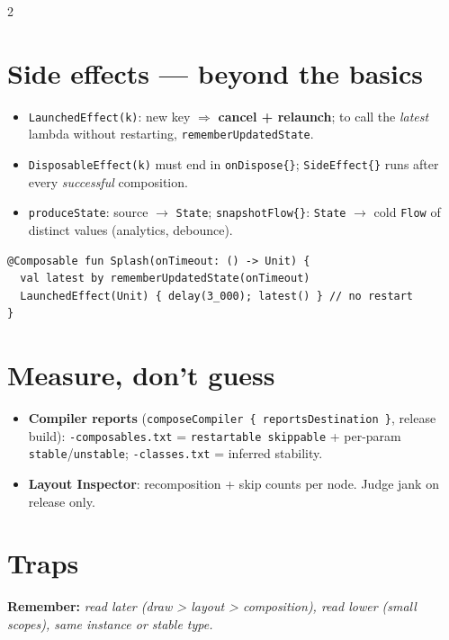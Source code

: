 \documentclass[8pt]{extarticle}
\begin{document}
\begin{multicols}{2}
\section{Side effects — beyond the basics}
\begin{itemize}\raggedright
  \item \texttt{LaunchedEffect(k)}: new key $\Rightarrow$ \textbf{cancel + relaunch}; to call
        the \emph{latest} lambda without restarting, \texttt{rememberUpdatedState}.
  \item \texttt{DisposableEffect(k)} must end in \texttt{onDispose\{\}};
        \texttt{SideEffect\{\}} runs after every \emph{successful} composition.
  \item \texttt{produceState}: source $\to$ \texttt{State}; \texttt{snapshotFlow\{\}}:
        \texttt{State} $\to$ cold \texttt{Flow} of distinct values (analytics, debounce).
\end{itemize}
\begin{lstlisting}[language=KotlinSheet]
@Composable fun Splash(onTimeout: () -> Unit) {
  val latest by rememberUpdatedState(onTimeout)
  LaunchedEffect(Unit) { delay(3_000); latest() } // no restart
}
\end{lstlisting}

\section{Measure, don't guess}
\begin{itemize}\raggedright
  \item \textbf{Compiler reports} (\texttt{composeCompiler \{ reportsDestination \}}, release
        build): \texttt{-composables.txt} = \texttt{restartable skippable} + per-param
        \texttt{stable}/\texttt{unstable}; \texttt{-classes.txt} = inferred stability.
  \item \textbf{Layout Inspector}: recomposition + skip counts per node. Judge jank on
        release only.
\end{itemize}

\section{Traps}
\begin{itemize}\raggedright
\end{itemize}

\textbf{Remember:} \emph{read later (draw > layout > composition), read lower (small
scopes), same instance or stable type.}


\end{multicols}

\end{document}
